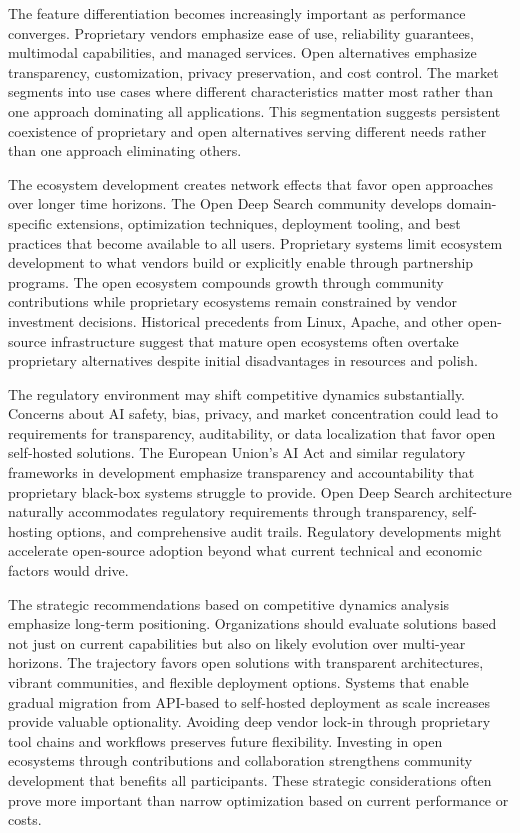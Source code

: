 The feature differentiation becomes increasingly important as performance converges. Proprietary vendors emphasize ease of use, reliability guarantees, multimodal capabilities, and managed services. Open alternatives emphasize transparency, customization, privacy preservation, and cost control. The market segments into use cases where different characteristics matter most rather than one approach dominating all applications. This segmentation suggests persistent coexistence of proprietary and open alternatives serving different needs rather than one approach eliminating others.

The ecosystem development creates network effects that favor open approaches over longer time horizons. The Open Deep Search community develops domain-specific extensions, optimization techniques, deployment tooling, and best practices that become available to all users. Proprietary systems limit ecosystem development to what vendors build or explicitly enable through partnership programs. The open ecosystem compounds growth through community contributions while proprietary ecosystems remain constrained by vendor investment decisions. Historical precedents from Linux, Apache, and other open-source infrastructure suggest that mature open ecosystems often overtake proprietary alternatives despite initial disadvantages in resources and polish.

The regulatory environment may shift competitive dynamics substantially. Concerns about AI safety, bias, privacy, and market concentration could lead to requirements for transparency, auditability, or data localization that favor open self-hosted solutions. The European Union's AI Act and similar regulatory frameworks in development emphasize transparency and accountability that proprietary black-box systems struggle to provide. Open Deep Search architecture naturally accommodates regulatory requirements through transparency, self-hosting options, and comprehensive audit trails. Regulatory developments might accelerate open-source adoption beyond what current technical and economic factors would drive.

The strategic recommendations based on competitive dynamics analysis emphasize long-term positioning. Organizations should evaluate solutions based not just on current capabilities but also on likely evolution over multi-year horizons. The trajectory favors open solutions with transparent architectures, vibrant communities, and flexible deployment options. Systems that enable gradual migration from API-based to self-hosted deployment as scale increases provide valuable optionality. Avoiding deep vendor lock-in through proprietary tool chains and workflows preserves future flexibility. Investing in open ecosystems through contributions and collaboration strengthens community development that benefits all participants. These strategic considerations often prove more important than narrow optimization based on current performance or costs.

